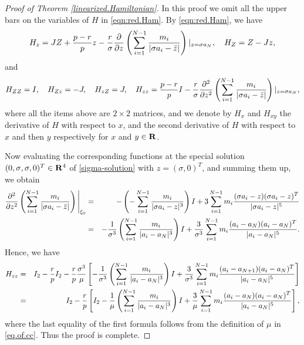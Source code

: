 \documentclass[11pt]{article}
\def\nn{\nonumber}
\def\R{{\bf R}}
\def\sg{{\sigma}}
\begin{document}
\begin{proof}[Proof of Theorem \ref{linearized.Hamiltonian}]
       In this proof we omit all the upper bars on the variables of $H$ in \eqref{eqn:red.Ham}. By \eqref{eqn:red.Ham}, we have
       \begin{align}
        H_z=JZ+\frac{p-r}{p}z
        -\frac{r}{\sigma}{\partial\over\partial z}\left(\sum_{i=1}^{N-1}{m_i\over|\sg a_i-\bar{z}|}\right)|_{z=\sg a_{N}},  \quad H_{Z} =Z-Jz, 
       \end{align}
       and
       \begin{align}
        H_{ZZ}=I,\quad H_{Zz}=-J, \quad H_{zZ}=J, \quad 
        H_{zz}=\frac{p-r}{p}I-\frac{r}{\sigma}{\partial^2\over\partial z^2}\left(\sum_{i=1}^{N-1}{m_i\over|\sg a_i-\bar{z}|}\right)|_{z=\sg a_{N}},
       \end{align}
       where all the items above are $2\times2$ matrices, and we denote by $H_x$ and $H_{xy}$
       the derivative of $H$ with respect to $x$, and the second derivative of $H$ with respect to
       $x$ and then $y$ respectively for $x$ and $y\in\R$.
       
       Now evaluating the corresponding functions at the special solution
       $({0,\sg},{\sg,0})^T\in\R^{4}$
       of \eqref{sigma-solution} with $z=(\sg,0)^T$, and summing them up, we
       obtain
       \begin{eqnarray}
       \frac{\partial^2}{\partial z^2}\left(\sum_{i=1}^{N-1}{m_i\over|\sg a_i-\bar{z}|}\right)\Bigg|_{\xi_0}
       &=&-\left(-\sum_{i=1}^{N-1}{m_i\over|\sigma a_i-z|^3}\right)I
          +3\sum_{i=1}^{N-1} m_i\frac{(\sg a_i-z)(\sg a_i-z)^T}{|\sigma a_i-z|^5}
       \nonumber\\
       &=&-{1\over\sg^3}\left(\sum_{i=1}^{N-1}{m_i\over|a_i-a_{N}|^3}\right)I
       +{3\over\sg^3}\sum_{i=1}^{N-1} m_i\frac{(a_i-a_{N})(a_i-a_{N})^T}{|a_i-a_{N}|^5}.
       \label{U_zz}
       \end{eqnarray}
       Hence, we have
       \begin{eqnarray}
       H_{zz}&=&I_2-{r\over p}I_2-{r\over p}{\sg^3\over\mu}
                  \left[-{1\over\sg^3}\left(\sum_{i=1}^{N-1}{m_i\over|a_i-a_{N}|^3}\right)I
                  +{3\over\sg^3}\sum_{i=1}^{N-1} m_i\frac{(a_i-a_{N+1})(a_i-a_{N})^T}{|a_i-a_{N}|^5}\right]
                  \nn\\
             &=&I_2-{r\over p}\left[I_2-{1\over\mu}\left(\sum_{i=1}^{N-1}{m_i\over|a_i-a_{N}|^3}\right)I
             +{3\over\mu}\sum_{i=1}^{N-1} m_i\frac{(a_i-a_{N})(a_i-a_{N})^T}{|a_i-a_{N}|^5}\right],
       \end{eqnarray}
       where the last equality of the first formula follows from the definition of $\mu$ in \eqref{eq.of.cc}.
       Thus the proof is complete. 
\end{proof}
\end{document}
